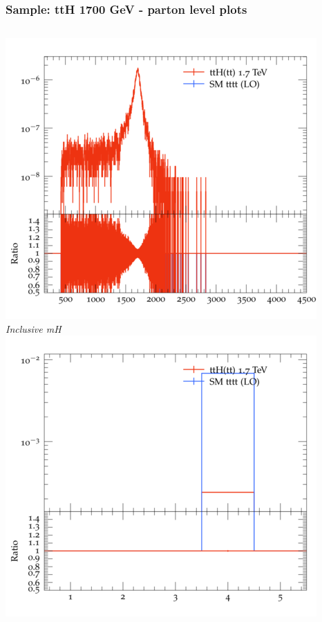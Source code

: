 \documentclass{beamer}
\begin{document}
\begin{frame}
\frametitle{Sample: ttH 1700 GeV - parton level plots}
\begin{columns}
\includegraphics[width=\textwidth]{../plots/ttH_1700/tttt_ttH/Inclusive_mH.png}\\
\textit{\small Inclusive mH}
\includegraphics[width=\textwidth]{../plots/ttH_1700/tttt_ttH/Inclusive_nTop.png}\\

\end{columns}
\end{frame}
\end{document}
